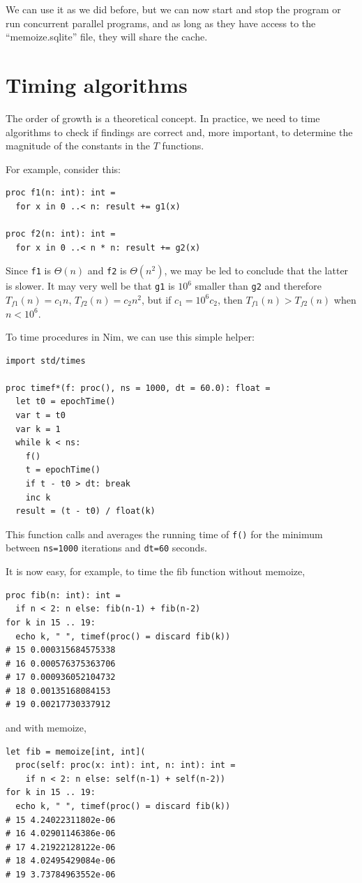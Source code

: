 \documentclass[justified, sixbynine]{tufte-book}
\def\ft{\small\tt}
\theoremstyle{plain}%
\newtheorem * {corollary}{Corollary}
\theoremstyle{definition}
\theoremstyle{remark}
\newtheorem * {remark}{Remark}
\newtheorem * {note}{Note}
\begin{document}
\begin{fullwidth}
We can use it as we did before, but we can now start and stop the program or run concurrent parallel programs, and as long as they have access to the ``memoize.sqlite'' file, they will share the cache.


\goodbreak\section{Timing algorithms}

The order of growth is a theoretical concept. In practice, we need to time algorithms to check if findings are correct and, more important, to determine the magnitude of the constants in the $T$ functions.

For example, consider this:
\begin{lstlisting}
proc f1(n: int): int =
  for x in 0 ..< n: result += g1(x)

proc f2(n: int): int =
  for x in 0 ..< n * n: result += g2(x)
\end{lstlisting}


Since {\ft f1} is $\Theta(n)$ and {\ft f2} is $\Theta(n^2)$, we may be led to conclude that the latter is slower. It may very well be that {\ft g1} is $10^6$ smaller than {\ft g2} and therefore $T_{f1}(n) = c_1 n$, $T_{f2}(n) = c_2 n^2$, but if $c_1 = 10^6 c_2$, then $T_{f1}(n) > T_{f2}(n)$ when $n<10^6$.

To time procedures in Nim, we can use this simple helper:

\begin{lstlisting}[caption={in file: {\ft nlib.nim}}]
import std/times

proc timef*(f: proc(), ns = 1000, dt = 60.0): float =
  let t0 = epochTime()
  var t = t0
  var k = 1
  while k < ns:
    f()
    t = epochTime()
    if t - t0 > dt: break
    inc k
  result = (t - t0) / float(k)
\end{lstlisting}

This function calls and averages the running time of {\ft f()} for the minimum between {\ft ns=1000} iterations and {\ft dt=60} seconds.

It is now easy, for example, to time the fib function without memoize,
\begin{lstlisting}
proc fib(n: int): int =
  if n < 2: n else: fib(n-1) + fib(n-2)
for k in 15 .. 19:
  echo k, " ", timef(proc() = discard fib(k))
# 15 0.000315684575338
# 16 0.000576375363706
# 17 0.000936052104732
# 18 0.00135168084153
# 19 0.00217730337912
\end{lstlisting}
and with memoize,
\begin{lstlisting}
let fib = memoize[int, int](
  proc(self: proc(x: int): int, n: int): int =
    if n < 2: n else: self(n-1) + self(n-2))
for k in 15 .. 19:
  echo k, " ", timef(proc() = discard fib(k))
# 15 4.24022311802e-06
# 16 4.02901146386e-06
# 17 4.21922128122e-06
# 18 4.02495429084e-06
# 19 3.73784963552e-06
\end{lstlisting}


\end{fullwidth}
\end{document}
